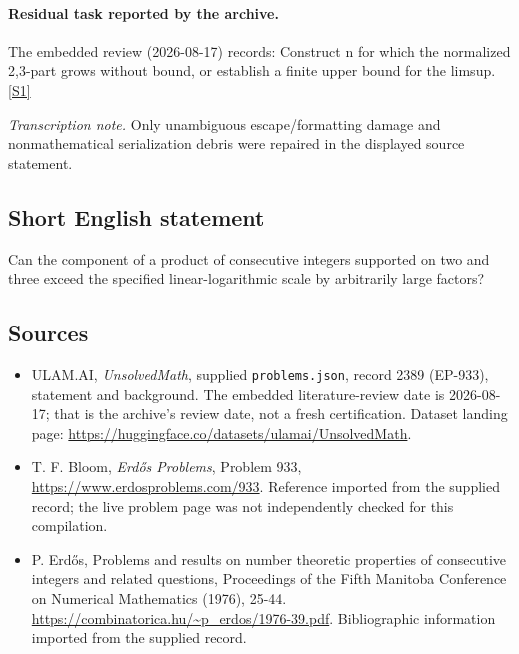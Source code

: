 \documentclass[11pt,a4paper]{article}
\newcommand{\sref}[2]{\hyperlink{source:#1:#2}{[S#2]}}
\begin{document}
\paragraph{Residual task reported by the archive.}

The embedded review (2026-08-17) records: Construct n for which the normalized 2,3-part grows without bound, or establish a finite upper bound for the limsup. \sref{2389}{1}

{\small\emph{Transcription note.} Only unambiguous escape/formatting damage and nonmathematical serialization debris were repaired in the displayed source statement.}

\subsection{Short English statement}

Can the component of a product of consecutive integers supported on two and three exceed the specified linear-logarithmic scale by arbitrarily large factors?

\subsection{Sources}

{\small

\begin{itemize}

\item[\hypertarget{source:2389:1}{S1}] ULAM.AI, \emph{UnsolvedMath}, supplied \texttt{problems.json}, record 2389 (EP-933), statement and background. The embedded literature-review date is 2026-08-17; that is the archive’s review date, not a fresh certification. Dataset landing page: \url{https://huggingface.co/datasets/ulamai/UnsolvedMath}.

\item[\hypertarget{source:2389:2}{S2}] T. F. Bloom, \emph{Erdős Problems}, Problem 933, \url{https://www.erdosproblems.com/933}. Reference imported from the supplied record; the live problem page was not independently checked for this compilation.

\item[\hypertarget{source:2389:3}{S3}] P. Erdős, Problems and results on number theoretic properties of consecutive integers and related questions, Proceedings of the Fifth Manitoba Conference on Numerical Mathematics (1976), 25-44. \url{https://combinatorica.hu/~p_erdos/1976-39.pdf}. Bibliographic information imported from the supplied record.

\end{itemize}

}

\label{end:2389}
\end{document}
